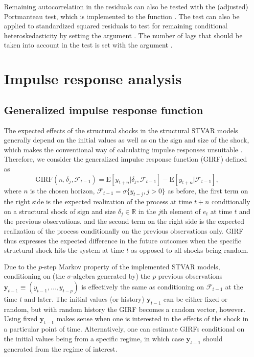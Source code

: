 \documentclass[nojss]{jss}
\begin{document}
Remaining autocorrelation in the residuals can also be tested with the (adjusted) Portmanteau test, which is implemented to the function . The test can also be applied to standardized squared residuals to test for remaining conditional heteroskedasticity by setting the argument . The number of lags that should be taken into account in the test is set with the argument .


\section{Impulse response analysis}\label{sec:impulseresponse}

\subsection{Generalized impulse response function}
The expected effects of the structural shocks in the structural STVAR models generally depend on the initial values as well as on the sign and size of the shock, which makes the conventional way of calculating impulse responses unsuitable \citep[see, e.g.,][Chapter~4]{Kilian+Lutkepohl:2017}. Therefore, we  consider the generalized impulse response function (GIRF) \citep{Koop+Pesaran+Potter:1996} defined as
\begin{equation}\label{eq:girf}
\text{GIRF}(n,\delta_j,\mathcal{F}_{t-1}) = \text{E}[y_{t+n}|\delta_j,\mathcal{F}_{t-1}] - \text{E}[y_{t+n}|\mathcal{F}_{t-1}],
\end{equation}
where $n$ is the chosen horizon, $\mathcal{F}_{t-1}=\sigma\lbrace y_{t-j},j>0\rbrace$ as before, the first term on the right side is the expected realization of the process at time $t+n$ conditionally on a structural shock of sign and size $\delta_j \in\mathbb{R}$ in the $j$th element of $e_t$ at time $t$ and the previous observations, and the second term on the right side is the expected realization of the process conditionally on the previous observations only. GIRF thus expresses the expected difference in the future outcomes when the specific structural shock hits the system at time $t$ as opposed to all shocks being random.

Due to the $p$-step Markov property of the implemented STVAR models, conditioning on (the $\sigma$-algebra generated by) the $p$ previous observations $\boldsymbol{y}_{t-1}\equiv(y_{t-1},...,y_{t-p})$ is effectively the same as conditioning on $\mathcal{F}_{t-1}$ at the time $t$ and later. The initial values (or history) $\boldsymbol{y}_{t-1}$ can be either fixed or random, but with random history the GIRF becomes a random vector, however. Using fixed $\boldsymbol{y}_{t-1}$ makes sense when one is interested in the effects of the shock in a particular point of time. Alternatively, one can estimate GIRFs conditional on the initial values being from a specific regime, in which case $\boldsymbol{y}_{t-1}$ should generated from the regime of interest.
\end{document}
